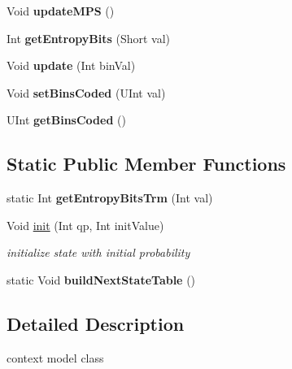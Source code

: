 \begin{DoxyCompactItemize}
Void {\bfseries update\+M\+PS} ()
\item 
\mbox{\label{class_context_model_ad8db1ed3ede769929b4c0fec5c1687ec}} 
Int {\bfseries get\+Entropy\+Bits} (Short val)
\item 
\mbox{\label{class_context_model_a585647408bc9ccd6e5e2850cf34ddc8a}} 
Void {\bfseries update} (Int bin\+Val)
\item 
\mbox{\label{class_context_model_aa89e7ddd62d2d47c2b7fa8e4ab8bdb21}} 
Void {\bfseries set\+Bins\+Coded} (U\+Int val)
\item 
\mbox{\label{class_context_model_aab00f8121ca8df77402bd541147d8a25}} 
U\+Int {\bfseries get\+Bins\+Coded} ()
\end{DoxyCompactItemize}
\subsection*{Static Public Member Functions}
\begin{DoxyCompactItemize}
\item 
\mbox{\label{class_context_model_af695df0920a820e36947e805189abd0b}} 
static Int {\bfseries get\+Entropy\+Bits\+Trm} (Int val)
\end{DoxyCompactItemize}
\begin{DoxyCompactItemize}
\item 
Void \hyperlink{class_context_model_aaa5e3418f274f7de8f7d99731a130f1a}{init} (Int qp, Int init\+Value)
\begin{DoxyCompactList}\small\item\em initialize state with initial probability \end{DoxyCompactList}\item 
\mbox{\label{class_context_model_aa4753719bb2ceccbe83c59f0ecf01b6d}} 
static Void {\bfseries build\+Next\+State\+Table} ()
\end{DoxyCompactItemize}


\subsection{Detailed Description}
context model class 

